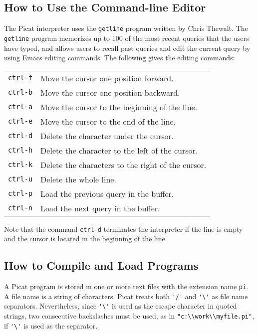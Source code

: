 \subsection{How to Use the Command-line Editor}
The Picat interpreter uses the \texttt{getline} program written by Chris Thewalt. The \texttt{getline} program memorizes up to 100 of the most recent queries that the users have typed, and allows users to recall past queries and edit the current query by using Emacs editing commands. The following gives the editing commands:

\begin{tabular}{ll}
\verb+ctrl-f+ & Move the cursor one position forward. \\
\verb+ctrl-b+ & Move the cursor one position backward. \\
\verb+ctrl-a+ & Move the cursor to the beginning of the line. \\
\verb+ctrl-e+ & Move the cursor to the end of the line.  \\
\verb+ctrl-d+ & Delete the character under the cursor.  \\
\verb+ctrl-h+ & Delete the character to the left of the cursor.  \\
\verb+ctrl-k+ & Delete the characters to the right of the cursor. \\
\verb+ctrl-u+ & Delete the whole line.  \\
\verb+ctrl-p+ & Load the previous query in the buffer.  \\
\verb+ctrl-n+ & Load the next query in the buffer.
\end{tabular}

\noindent
Note that the command \verb+ctrl-d+ terminates the interpreter if the line is empty and the cursor is located in the beginning of the line.

\subsection{How to Compile and Load Programs}
A Picat program is stored in one or more text files with the extension name \texttt{pi}. A file name is a string of characters. Picat treats both  \verb+'/'+ and \verb+'\'+ as file name separators. Nevertheless, since \verb+'\'+ is used as the escape character in quoted strings, two consecutive backslashes must be used, as in \verb+"c:\\work\\myfile.pi"+, if \verb+'\'+ is used as the separator.

